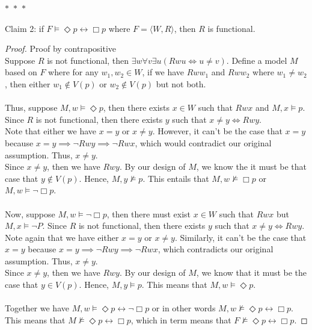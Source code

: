 \documentclass[12pt]{article}
\newcommand{\B}{\Box}
\newcommand{\D}{\Diamond}
\newcommand{\s}{\vDash}
\newcommand{\ns}{\nvDash}
\begin{document}
\noindent
\begin{center}
    $\ast$~$\ast$~$\ast$
\end{center}
Claim 2: if $F \vDash \D p \leftrightarrow \B p$ where $F = \langle W, R \rangle$, then $R$ is functional. 
\begin{proof} Proof by contrapositive\\
    Suppose $R$ is not functional, then $\exists w \forall v \exists u (Rwu \iff u \neq v)$.
    Define a model $M$ based on $F$ where for any $w_1, w_2 \in W$, if we have $Rww_1$ and $Rww_2$ where $w_1 \neq w_2$, then either $w_1 \notin V(p)$ or $w_2 \notin V(p)$ but not both.\\
    \\
    Thus, suppose $M, w \s \D p$, then there exists $x \in W$ such that $Rwx$ and $M, x \s p$.
    Since $R$ is not functional, then there exists $y$ such that $x \neq y \iff Rwy$.\\
    Note that either we have $x = y$ or $x \neq y$. 
    However, it can't be the case that $x = y$ because $x = y \implies \neg Rwy \implies \neg Rwx$, which would contradict our original assumption.
    Thus, $x \neq y$.\\
    Since $x \neq y$, then we have $Rwy$.
    By our design of $M$, we know the it must be that case that $y \notin V(p)$.
    Hence, $M, y \ns p$. This entails that $M, w \ns \B p$ or $M, w \s \neg \B p$.\\
    \\
    Now, suppose $M, w \s \neg \B p$, then there must exist $x \in W$ such that $Rwx$ but $M,x \s \neg P$.
    Since $R$ is not functional, then there exists $y$ such that $x \neq y \iff Rwy$.\\
    Note again that we have either $x = y$ or $x \neq y$. 
    Similarly, it can't be the case that $x = y$ because $x = y \implies \neg Rwy \implies \neg Rwx$, which contradicts our original assumption.
    Thus, $x \neq y$.\\
    Since $x \neq y$, then we have $Rwy$. By our design of $M$, we know that it must be the case that $y \in V(p)$.
    Hence, $M, y \s p$. This means that $M, w \s \D p$.\\
    \\
    Together we have $M, w \s \D p \leftrightarrow \neg \B p$ or in other words $M, w \ns \D p \leftrightarrow \B p$. 
    This means that $M \ns \D p \leftrightarrow \B p$, which in term means that $F \ns \D p \leftrightarrow \B p$.



\end{proof}
\end{document}
